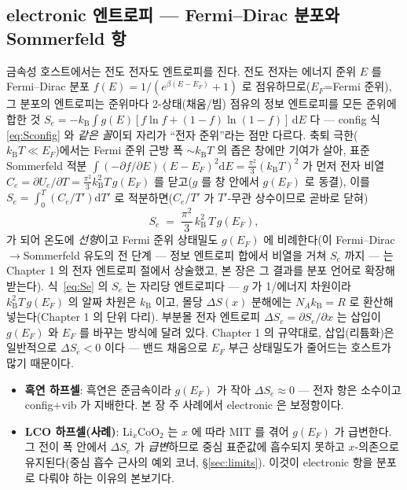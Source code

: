 \documentclass[11pt,a4paper]{article}
\newcommand{\dd}{\mathrm{d}}
\newcommand{\kB}{k_{\mathrm B}}
\begin{document}
\subsection{electronic 엔트로피 — Fermi--Dirac 분포와 Sommerfeld 항}\label{ssec:elec}
금속성 호스트에서는 전도 전자도 엔트로피를 진다. 전도 전자는 에너지 준위 $E$ 를 Fermi--Dirac 분포
$f(E)=1/(e^{\beta(E-E_F)}+1)$ 로 점유하므로($E_F$=Fermi 준위), 그 분포의 엔트로피는 준위마다 2-상태(채움/빔)
점유의 정보 엔트로피를 모든 준위에 합한 것 $S_e=-\kB\int g(E)[f\ln f+(1-f)\ln(1-f)]\,\dd E$ 다 — config 식
\eqref{eq:Sconfig} 와 \emph{같은 꼴}이되 자리가 ``전자 준위''라는 점만 다르다. 축퇴 극한($\kB T\ll E_F$)에서는
Fermi 준위 근방 폭 $\sim\kB T$ 의 좁은 창에만 기여가 살아, 표준 Sommerfeld 적분
$\int(-\partial f/\partial E)(E-E_F)^2\dd E=\tfrac{\pi^2}{3}(\kB T)^2$ 가 먼저 전자 비열 $C_e=\partial U_e/\partial T
=\tfrac{\pi^2}{3}\kB^2T\,g(E_F)$ 를 닫고($g$ 를 창 안에서 $g(E_F)$ 로 동결), 이를 $S_e=\int_0^T(C_e/T')\dd T'$ 로
적분하면($C_e/T'$ 가 $T'$-무관 상수이므로 곧바로 닫혀)
\begin{equation}
S_e \;=\; \frac{\pi^2}{3}\,\kB^2\,T\,g(E_F),
\label{eq:Se}
\end{equation}
가 되어 온도에 \emph{선형}이고 Fermi 준위 상태밀도 $g(E_F)$ 에 비례한다(이 Fermi--Dirac$\to$Sommerfeld
유도의 전 단계 — 정보 엔트로피 합에서 비열을 거쳐 $S_e$ 까지 — 는 Chapter 1 의 전자 엔트로피 절에서 상술했고,
본 장은 그 결과를 분포 언어로 확장해 받는다). 식~\eqref{eq:Se} 의 $S_e$ 는 자리당 엔트로피다 — $g$ 가
1/에너지 차원이라 $\kB^2 T\,g(E_F)$ 의 알짜 차원은 $\kB$ 이고, 몰당 $\Delta S(x)$ 분해에는 $N_A\kB=R$ 로
환산해 넣는다(Chapter 1 의 단위 다리). 부분몰 전자 엔트로피
$\Delta S_e=\partial S_e/\partial x$ 는 삽입이 $g(E_F)$ 와 $E_F$ 를 바꾸는 방식에 달려 있다. Chapter 1 의
규약대로, 삽입(리튬화)은 일반적으로 $\Delta S_e<0$ 이다 — 밴드 채움으로 $E_F$ 부근 상태밀도가 줄어드는 호스트가
많기 때문이다.
\begin{itemize}[leftmargin=1.4em,itemsep=1pt]
\item \textbf{흑연 하프셀}: 흑연은 준금속이라 $g(E_F)$ 가 작아 $\Delta S_e\approx0$ — 전자 항은 소수이고
config$+$vib 가 지배한다. 본 장 주 사례에서 electronic 은 보정항이다.
\item \textbf{LCO 하프셀(사례)}: Li$_x$CoO$_2$ 는 $x$ 에 따라 MIT 를 겪어 $g(E_F)$ 가
급변한다. 그 전이 폭 안에서 $\Delta S_e$ 가 \emph{급변}하므로 중심 표준값에 흡수되지 못하고 $x$-의존으로
유지된다(중심 흡수 근사의 예외 코너, \S\ref{sec:limits}). 이것이 electronic 항을 분포로 다뤄야 하는 이유의 본보기다.
\end{itemize}
\end{document}
